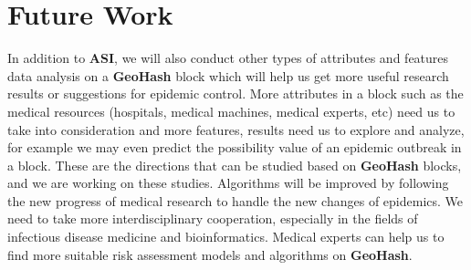 \documentclass[conference]{IEEEtran}
\begin{document}
\section{Future Work}
In addition to \textbf{ASI}, we will also conduct other types of attributes and features data analysis on a \textbf{GeoHash} block which will help us get more useful research results or suggestions for epidemic control.
More attributes in a block such as the medical resources (hospitals, medical machines, medical experts, etc) need us to take into consideration and more features, results need us to explore and analyze, for example we may even predict the possibility value of an epidemic outbreak in a block.
These are the directions that can be studied based on \textbf{GeoHash} blocks, and we are working on these studies.
Algorithms will be improved by following the new progress of medical research to handle the new changes of epidemics.
We need to take more interdisciplinary cooperation, especially in the fields of infectious disease medicine and bioinformatics.
Medical experts can help us to find more suitable risk assessment models and algorithms on \textbf{GeoHash}.



\end{document}
